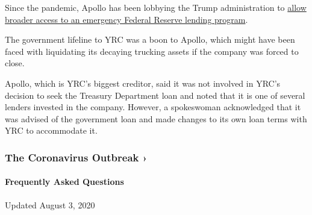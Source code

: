 Since the pandemic, Apollo has been lobbying the Trump administration to
\href{https://www.nytimes3xbfgragh.onion/2020/04/04/business/economy/apollo-federal-reserve-lending-talf.html}{allow
broader access to an emergency Federal Reserve lending program}.

The government lifeline to YRC was a boon to Apollo, which might have
been faced with liquidating its decaying trucking assets if the company
was forced to close.

Apollo, which is YRC's biggest creditor, said it was not involved in
YRC's decision to seek the Treasury Department loan and noted that it is
one of several lenders invested in the company. However, a spokeswoman
acknowledged that it was advised of the government loan and made changes
to its own loan terms with YRC to accommodate it.

\href{https://www.nytimes3xbfgragh.onion/news-event/coronavirus?action=click\&pgtype=Article\&state=default\&region=MAIN_CONTENT_3\&context=storylines_faq}{}

\hypertarget{the-coronavirus-outbreak-}{%
\subsubsection{The Coronavirus Outbreak
›}\label{the-coronavirus-outbreak-}}

\hypertarget{frequently-asked-questions}{%
\paragraph{Frequently Asked
Questions}\label{frequently-asked-questions}}

Updated August 3, 2020

